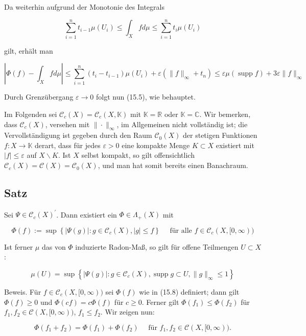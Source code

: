 \documentclass[10pt, letterpaper]{article}
\begin{document}
Da weiterhin aufgrund der Monotonie des Integrals

$$
\sum_{i=1}^{n} t_{i-1} \mu\left(U_{i}\right) \leq \int_{X} f d \mu \leq \sum_{i=1}^{n} t_{i} \mu\left(U_{i}\right)
$$

gilt, erhält man

$$
\left|\Phi(f)-\int_{X} f d \mu\right| \leq \sum_{i=1}^{n}\left(t_{i}-t_{i-1}\right) \mu\left(U_{i}\right)+\varepsilon\left(\|f\|_{\infty}+t_{n}\right) \leq \varepsilon \mu(\operatorname{supp} f)+3 \varepsilon\|f\|_{\infty}
$$

Durch Grenzübergang $\varepsilon \rightarrow 0$ folgt nun (15.5), wie behauptet.

Im Folgenden sei $\mathcal{C}_{c}(X)=\mathcal{C}_{c}(X, \mathbb{K})$ mit $\mathbb{K}=\mathbb{R}$ oder $\mathbb{K}=\mathbb{C}$. Wir bemerken, dass $\mathcal{C}_{c}(X)$, versehen mit $\|\cdot\|_{\infty}$, im Allgemeinen nicht vollständig ist; die Vervollständigung ist gegeben durch den Raum $\mathcal{C}_{0}(X)$ der stetigen Funktionen $f: X \rightarrow \mathbb{K}$ derart, dass für jedes $\varepsilon>0$ eine kompakte Menge $K \subset X$ existiert mit $|f| \leq \varepsilon$ auf $X \backslash K$. Ist $X$ selbst kompakt, so gilt offensichtlich $\mathcal{C}_{c}(X)=\mathcal{C}(X)=\mathcal{C}_{0}(X)$, und man hat somit bereits einen Banachraum.

\subsection*{Satz}
Sei $\Psi \in \mathcal{C}_{c}(X)^{\prime}$. Dann existiert ein $\Phi \in \Lambda_{+}(X)$ mit

$$
\Phi(f):=\sup \left\{|\Psi(g)|: g \in \mathcal{C}_{c}(X),|g| \leq f\right\} \quad \text { für alle } f \in \mathcal{C}_{c}(X,[0, \infty))
$$

Ist ferner $\mu$ das von $\Phi$ induzierte Radon-Maß, so gilt für offene Teilmengen $U \subset X$ :

$$
\mu(U)=\sup \left\{|\Psi(g)|: g \in \mathcal{C}_{c}(X), \operatorname{supp} g \subset U,\|g\|_{\infty} \leq 1\right\}
$$

Beweis. Für $f \in \mathcal{C}_{c}(X,[0, \infty))$ sei $\Phi(f)$ wie in (15.8) definiert; dann gilt $\Phi(f) \geq 0$ und $\Phi(c f)=c \Phi(f)$ für $c \geq 0$. Ferner gilt $\Phi\left(f_{1}\right) \leq \Phi\left(f_{2}\right)$ für $f_{1}, f_{2} \in \mathcal{C}(X,[0, \infty))$, $f_{1} \leq f_{2}$. Wir zeigen nun:

$$
\Phi\left(f_{1}+f_{2}\right)=\Phi\left(f_{1}\right)+\Phi\left(f_{2}\right) \quad \text { für } f_{1}, f_{2} \in \mathcal{C}(X,[0, \infty)) .
$$
\end{document}

